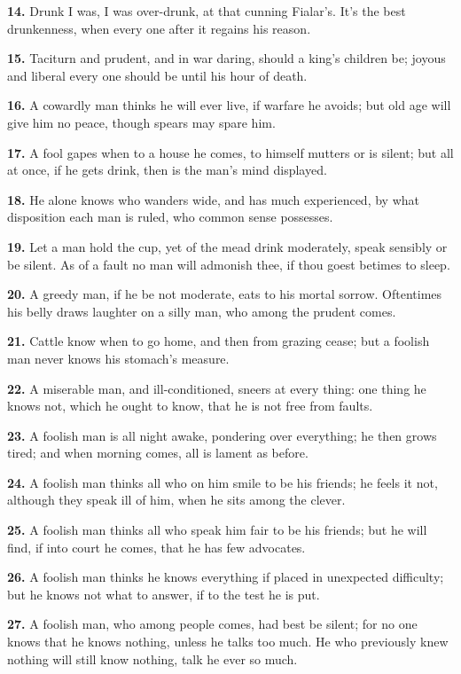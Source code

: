 \textbf{14.} Drunk I was, I was over-drunk, at that cunning Fialar's. It's
the best drunkenness, when every one after it regains his reason.

\textbf{15.} Taciturn and prudent, and in war daring, should a king's
children be; joyous and liberal every one should be until his hour of
death.

\textbf{16.} A cowardly man thinks he will ever live, if warfare he avoids;
but old age will give him no peace, though spears may spare him.

\textbf{17.} A fool gapes when to a house he comes, to himself mutters or is
silent; but all at once, if he gets drink, then is the man's mind
displayed.

\textbf{18.} He alone knows who wanders wide, and has much experienced, by
what disposition each man is ruled, who common sense possesses.

\textbf{19.} Let a man hold the cup, yet of the mead drink moderately, speak
sensibly or be silent. As of a fault no man will admonish thee, if
thou goest betimes to sleep.

\textbf{20.} A greedy man, if he be not moderate, eats to his mortal sorrow.
Oftentimes his belly draws laughter on a silly man, who among the
prudent comes.

\textbf{21.} Cattle know when to go home, and then from grazing cease; but a
foolish man never knows his stomach's measure.

\textbf{22.} A miserable man, and ill-conditioned, sneers at every thing: one
thing he knows not, which he ought to know, that he is not free from
faults.

\textbf{23.} A foolish man is all night awake, pondering over everything; he
then grows tired; and when morning comes, all is lament as before.

\textbf{24.} A foolish man thinks all who on him smile to be his friends; he
feels it not, although they speak ill of him, when he sits among the
clever.

\textbf{25.} A foolish man thinks all who speak him fair to be his friends;
but he will find, if into court he comes, that he has few advocates.

\textbf{26.} A foolish man thinks he knows everything if placed in unexpected
difficulty; but he knows not what to answer, if to the test he is put.

\textbf{27.} A foolish man, who among people comes, had best be silent; for
no one knows that he knows nothing, unless he talks too much. He who
previously knew nothing will still know nothing, talk he ever so much.


